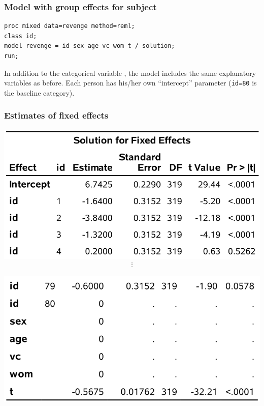 \documentclass{beamer}
\begin{document}
\begin{frame}[fragile]
\frametitle{Model with group effects for subject}
\begin{tcolorbox}[colback=white, colframe=hecblue, title=\SASlang{} code to fit a linear model via REML]
\begin{verbatim}
proc mixed data=revenge method=reml; 
class id; 
model revenge = id sex age vc wom t / solution; 
run;
\end{verbatim}
\end{tcolorbox}
{\footnotesize In addition to the categorical variable , the model includes the same explanatory variables as before. Each person has his/her own ``intercept'' parameter (\texttt{id=80} is the baseline category). 


}
\end{frame}

 \begin{frame}
\frametitle{Estimates of fixed effects}
\begin{center}
\includegraphics[width = 0.6\linewidth]{img/c6/slides7-e01}
\begin{align*}
\vdots      \end{align*}



\includegraphics[width = 0.6\linewidth]{img/c6/slides7-e02}
\end{center}

\end{frame}

\end{document}
